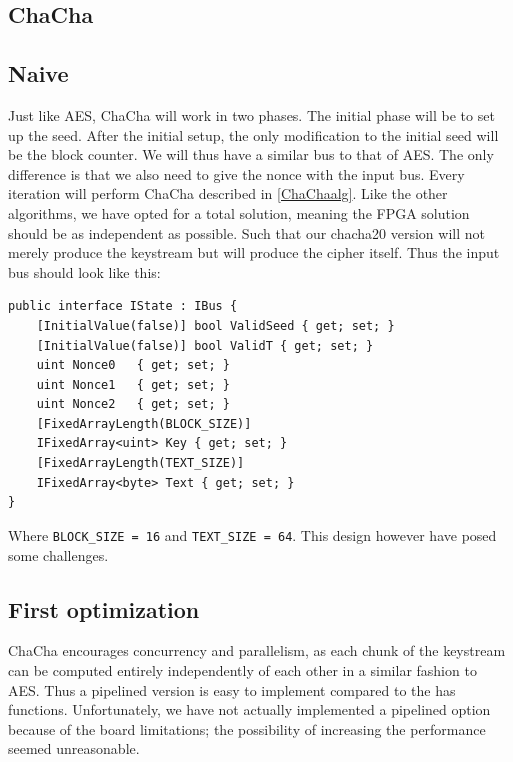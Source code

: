 \documentclass[a4paper, openany]{book}
\begin{document}
\begin{abstact}
\section{ChaCha}
\label{sec:org8f1abf3}

\subsection{Naive}
\label{ChaChaNaive}
Just like AES, ChaCha will work in two phases. The initial phase will be to set up the seed. After the initial setup, the only modification to the initial seed will be the block counter. We will thus have a similar bus to that of AES. The only difference is that we also need to give the nonce with the input bus. Every iteration will perform ChaCha described in \ref{ChaChaalg}. Like the other algorithms, we have opted for a total solution, meaning the FPGA solution should be as independent as possible. Such that our chacha20 version will not merely produce the keystream but will produce the cipher itself. Thus the input bus should look like this:
\begin{verbatim}
public interface IState : IBus {
    [InitialValue(false)] bool ValidSeed { get; set; }
    [InitialValue(false)] bool ValidT { get; set; }
    uint Nonce0   { get; set; }
    uint Nonce1   { get; set; }
    uint Nonce2   { get; set; }
    [FixedArrayLength(BLOCK_SIZE)]
    IFixedArray<uint> Key { get; set; }
    [FixedArrayLength(TEXT_SIZE)]
    IFixedArray<byte> Text { get; set; }
}
\end{verbatim}
Where \texttt{BLOCK\_SIZE = 16} and \texttt{TEXT\_SIZE = 64}. This design however have posed some challenges.
\subsection{First optimization}
\label{ChaCha1}
ChaCha encourages concurrency and parallelism, as each chunk of the keystream can be computed entirely independently of each other in a similar fashion to AES. Thus a pipelined version is easy to implement compared to the has functions. Unfortunately, we have not actually implemented a pipelined option because of the board limitations; the possibility of increasing the performance seemed unreasonable.


\end{abstact}
\end{document}
